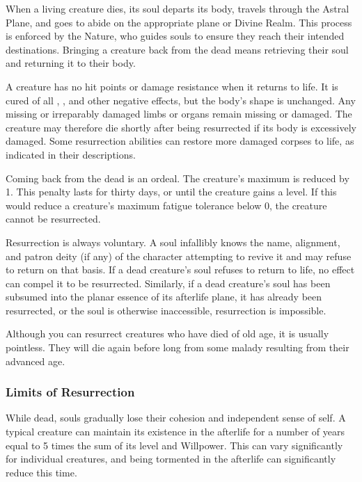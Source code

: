     When a living creature dies, its soul departs its body, travels through the Astral Plane, and goes to abide on the appropriate plane or Divine Realm.
    This process is enforced by the Nature, who guides souls to ensure they reach their intended destinations.
    Bringing a creature back from the dead means retrieving their soul and returning it to their body.

    A creature has no hit points or damage resistance when it returns to life.
    It is cured of all , , and other negative effects, but the body's shape is unchanged.
    Any missing or irreparably damaged limbs or organs remain missing or damaged.
    The creature may therefore die shortly after being resurrected if its body is excessively damaged.
    Some resurrection abilities can restore more damaged corpses to life, as indicated in their descriptions.

    Coming back from the dead is an ordeal.
    The creature's maximum  is reduced by 1.
    This penalty lasts for thirty days, or until the creature gains a level.
    If this would reduce a creature's maximum fatigue tolerance below 0, the creature cannot be resurrected.

    Resurrection is always voluntary.
    A soul infallibly knows the name, alignment, and patron deity (if any) of the character attempting to revive it and may refuse to return on that basis.
    If a dead creature's soul refuses to return to life, no effect can compel it to be resurrected.
    Similarly, if a dead creature's soul has been subsumed into the planar essence of its afterlife plane, it has already been resurrected, or the soul is otherwise inaccessible, resurrection is impossible.

    Although you can resurrect creatures who have died of old age, it is usually pointless.
    They will die again before long from some malady resulting from their advanced age.

    \subsubsection{Limits of Resurrection}
    While dead, souls gradually lose their cohesion and independent sense of self.
    A typical creature can maintain its existence in the afterlife for a number of years equal to 5 times the sum of its level and Willpower.
    This can vary significantly for individual creatures, and being tormented in the afterlife can significantly reduce this time.

